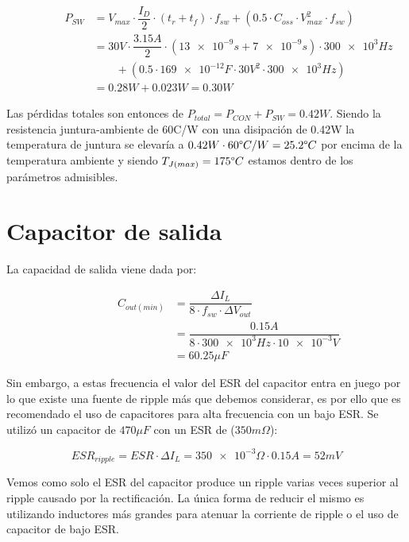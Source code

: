 \documentclass[12pt]{report}
\begin{document}
	\begin{equation}
		\begin{aligned}
		\qquad \qquad P_{SW} &= V_{max} \cdot \dfrac{I_D}{2} \cdot (t_r + t_f) \cdot f_{sw} + (0.5 \cdot C_{oss} \cdot V_{max}^2 \cdot f_{sw})\\
		& = 30V \cdot \dfrac{3.15A}{2} \cdot (\num{13e-9}s + \num{7e-9}s) \cdot \num{300e3}Hz \\
		& \qquad + (0.5 \cdot \num{169e-12}F \cdot 30V^2 \cdot \num{300e3}Hz)\\
		& = 0.28W + 0.023W = 0.30W
		\end{aligned}
	\end{equation}
	
	Las pérdidas totales son entonces de $P_{total} = P_{CON} + P_{SW} = 0.42W$. Siendo la resistencia juntura-ambiente de 60\textdegree C/W con una disipación de 0.42W la temperatura de juntura se elevaría a $0.42W \cdot 60\degree C/W = 25.2\degree C$ por encima de la temperatura ambiente y siendo $T_{J(max)} = 175\degree C$ estamos dentro de los parámetros admisibles.

\section{Capacitor de salida}

	La capacidad de salida viene dada por:

	\begin{equation}
		\begin{aligned}
		\qquad \qquad C_{out(min)} &= \dfrac{\Delta I_L}{8 \cdot f_{sw} \cdot \Delta V_{out}} \\
		& = \dfrac{0.15A}{8 \cdot \num{300e3}Hz \cdot \num{10e-3}V} \\
		& = 60.25 \mu F
		\end{aligned}
	\end{equation}

	Sin embargo, a estas frecuencia el valor del ESR del capacitor entra en juego por lo que existe una fuente de ripple más que debemos considerar, es por ello que es recomendado el uso de capacitores para alta frecuencia con un bajo ESR. Se utilizó un capacitor de $470 \mu F$ con un ESR de ($350 m \Omega$):
	
	\begin{equation}
		ESR_{ripple} = ESR \cdot \Delta I_L = \num{350e-3}\Omega \cdot 0.15A = 52mV
	\end{equation}
	
	Vemos como solo el ESR del capacitor produce un ripple varias veces superior al ripple causado por la rectificación. La única forma de reducir el mismo es utilizando inductores más grandes para atenuar la corriente de ripple o el uso de capacitor de bajo ESR.
	
\end{document}
